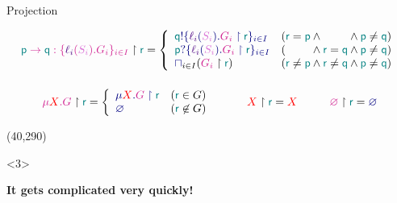 \begin{frame}{Projection}

\begin{displaymath}
  \begin{array}{c}
\gproj{\gmsg \Rp \Rq {{\gmsgbr {\lbl_i} {S_i} {G_i}}_{i\in I}}}{\Rr} =
\left\{%
\begin{array}{l l}
\lsend \Rq {{\lmsgbr {\lbl_i} {S_i} {\gproj{G_i}{\Rr}}}_{i\in I}} & (\Rr = \Rp \wedge \phantom{\Rr = \Rq} \wedge \Rp \neq \Rq) \\
\lrecv \Rp {{\lmsgbr {\lbl_i} {S_i} {\gproj{G_i}{\Rr}}}_{i\in I}} & (\phantom{\Rr = \Rp} \wedge \Rr = \Rq \wedge \Rp \neq \Rq) \\
\lmerge_{i \in I}(\gproj{G_i}{\Rr}) & (\Rr \neq \Rp \wedge \Rr \neq \Rq \wedge \Rp \neq \Rq) \\
\end{array}
\right.
\\[1cm]
\gproj{\grecur X G}{\Rr} =
\left\{%
\begin{array}{l l}
  \lrecur X {\gproj{G}{\Rr}} & (\Rr \in G) \\
  \lfinish & (\Rr \not\in G)
\end{array}
\right.
\hspace{1cm}
\gproj{\pvar X}{\Rr} = \pvar X
\hspace{1cm}
\gproj{\gfinish}{\Rr} = \lfinish
  \end{array}
\end{displaymath}

\noindent\makebox[\linewidth]{\rule{\columnwidth}{0.4pt}}

  \Put(40,290){%
    \begin{onlyenv}<3>
    \begin{minipage}{.86\columnwidth}
    \begin{infobox}
      \Large
      \textbf{It gets complicated very quickly!}
    \end{infobox}
    \end{minipage}
    \end{onlyenv}
  }
\end{frame}

